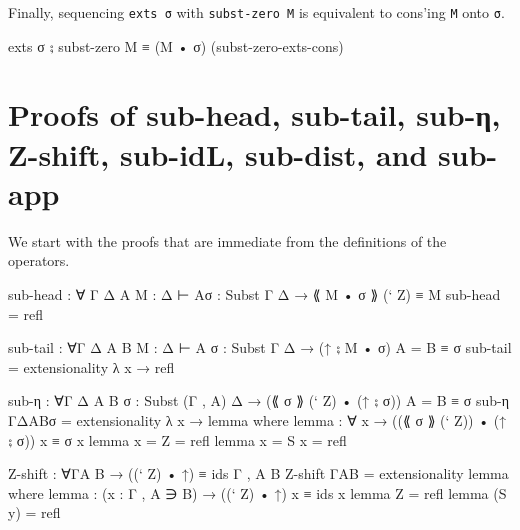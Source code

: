 Finally, sequencing \texttt{exts\ σ} with \texttt{subst-zero\ M} is
equivalent to cons'ing \texttt{M} onto \texttt{σ}.

\begin{myDisplay}
exts σ ⨟ subst-zero M ≡ (M • σ)       (subst-zero-exts-cons)
\end{myDisplay}

\hypertarget{proofs-of-sub-head-sub-tail-sub-ux3b7-z-shift-sub-idl-sub-dist-and-sub-app}{%
\section{Proofs of sub-head, sub-tail, sub-η, Z-shift, sub-idL,
sub-dist, and
sub-app}\label{proofs-of-sub-head-sub-tail-sub-ux3b7-z-shift-sub-idl-sub-dist-and-sub-app}}

We start with the proofs that are immediate from the definitions of the
operators.

\begin{fence}
\begin{code}
sub-head : ∀ {Γ Δ} {A} {M : Δ ⊢ A}{σ : Subst Γ Δ}
         → ⟪ M • σ ⟫ (` Z) ≡ M
sub-head = refl
\end{code}
\end{fence}

\begin{fence}
\begin{code}
sub-tail : ∀{Γ Δ} {A B} {M : Δ ⊢ A} {σ : Subst Γ Δ}
         → (↑ ⨟ M • σ) {A = B} ≡ σ
sub-tail = extensionality λ x → refl
\end{code}
\end{fence}

\begin{fence}
\begin{code}
sub-η : ∀{Γ Δ} {A B} {σ : Subst (Γ , A) Δ}
      → (⟪ σ ⟫ (` Z) • (↑ ⨟ σ)) {A = B} ≡ σ
sub-η {Γ}{Δ}{A}{B}{σ} = extensionality λ x → lemma
   where
   lemma : ∀ {x} → ((⟪ σ ⟫ (` Z)) • (↑ ⨟ σ)) x ≡ σ x
   lemma {x = Z} = refl
   lemma {x = S x} = refl
\end{code}
\end{fence}

\begin{fence}
\begin{code}
Z-shift : ∀{Γ}{A B}
        → ((` Z) • ↑) ≡ ids {Γ , A} {B}
Z-shift {Γ}{A}{B} = extensionality lemma
   where
   lemma : (x : Γ , A ∋ B) → ((` Z) • ↑) x ≡ ids x
   lemma Z = refl
   lemma (S y) = refl
\end{code}
\end{fence}

